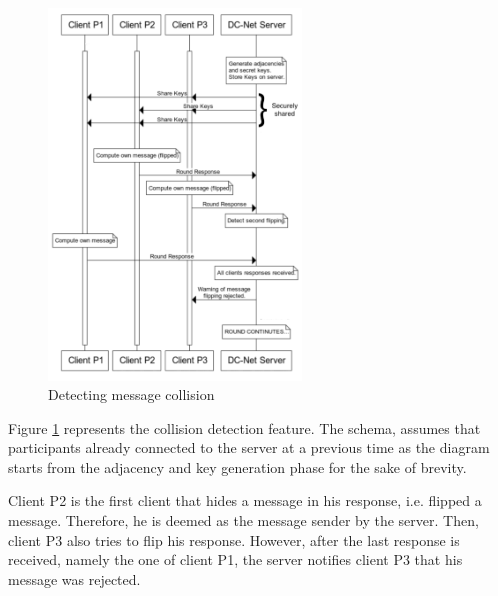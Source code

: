 \begin{figure}[H]
    \centering
    \includegraphics[width=0.6\textwidth]{Images/Design/collisionDetection.png}
    \caption{Detecting message collision}
    \label{fig:collisionDetection}
\end{figure}

Figure \ref{fig:collisionDetection} represents the collision detection feature. The schema, assumes that participants already connected to the server at a previous time as the diagram starts from the adjacency and key generation phase for the sake of brevity.

Client P2 is the first client that hides a message in his response, i.e. flipped a message. Therefore, he is deemed as the message sender by the server. Then, client P3 also tries to flip his response. However, after the last response is received, namely the one of client P1, the server notifies client P3 that his message was rejected.

